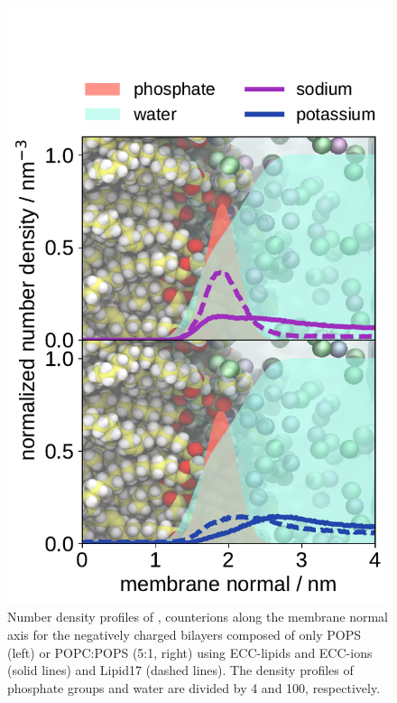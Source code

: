 \documentclass[journal=jpcbfk,manuscript=article]{achemso}
\newlength{\figheight}
\begin{document}
\begin{figure}[tbp!]
  \includegraphics[height=\figheight]{../img/ecc_pops/density_profiles_na-k-counterions_wat_phos_compar_5PC-1PS_ecclipids-lipid17.pdf}
  \caption{\label{fig:POPS-counterions-dens}
    Number density profiles of ,  counterions along the membrane normal axis 
    for the negatively charged bilayers composed of only POPS (left) or POPC:POPS (5:1, right) 
    using ECC-lipids and ECC-ions (solid lines) and Lipid17 (dashed lines).  
    The density profiles of phosphate groups and water are divided by 4 and 100, respectively.  
}
\end{figure} 
\end{document}
